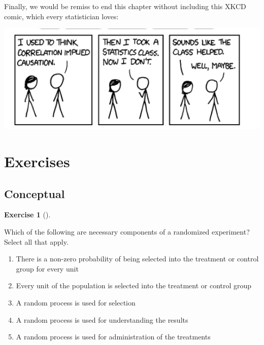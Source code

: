 \documentclass[
  letterpaper,
  DIV=11,
  numbers=noendperiod]{scrreprt}
\providecommand{\tightlist}{%
  \setlength{\itemsep}{0pt}\setlength{\parskip}{0pt}}\usepackage{longtable,booktabs,array}
\theoremstyle{definition}
\newtheorem{exercise}{Exercise}[chapter]
\theoremstyle{remark}
\begin{document}
Finally, we would be remiss to end this chapter without including this
XKCD comic, which every statistician loves:

\includegraphics{images/causation.png}

\hypertarget{sec-ex07}{%
\section{Exercises}\label{sec-ex07}}

\hypertarget{sec-ex07-conceptual}{%
\subsection{Conceptual}\label{sec-ex07-conceptual}}

\begin{exercise}[]\protect\hypertarget{exr-ch07-c01}{}\label{exr-ch07-c01}

Which of the following are necessary components of a randomized
experiment? Select all that apply.

\begin{enumerate}
\def\labelenumi{\alph{enumi})}
\tightlist
\item
  There is a non-zero probability of being selected into the treatment
  or control group for every unit
\item
  Every unit of the population is selected into the treatment or control
  group
\item
  A random process is used for selection
\item
  A random process is used for understanding the results
\item
  A random process is used for administration of the treatments
\end{enumerate}

\end{exercise}
\end{document}
